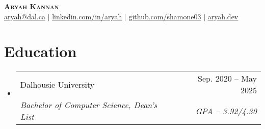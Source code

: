 \documentclass[letterpaper,11pt]{article}
\makeatletter
\newcommand{\resumeSubheading}[4]{
    \vspace{-2pt}\item
      \begin{tabular*}{0.97\textwidth}[t]{l@{\extracolsep{\fill}}r}
        #1 & #2 \\
        \textit{\small#3} & \textit{\small #4} \\
      \end{tabular*}\vspace{-7pt}
  }
\newcommand{\resumeSubHeadingListStart}{\begin{itemize}[leftmargin=0.15in, label={}]}
\newcommand{\resumeSubHeadingListEnd}{\end{itemize}}
\makeatother
\begin{document}

  \begin{center}
    \textbf{\Huge \scshape Aryah Kannan} \\ \vspace{1pt}
    \small \href{mailto:aryah@dal.ca}{\underline{aryah@dal.ca}} $|$
    \href{https://www.linkedin.com/in/aryahkannan/}{\underline{linkedin.com/in/aryah}} $|$
    \href{https://github.com/shamone03}{\underline{github.com/shamone03}} $|$
    \href{https://aryah.dev}{\underline{aryah.dev}}
  \end{center}


  \section{Education}
  \resumeSubHeadingListStart
  \resumeSubheading
  {Dalhousie University}{Sep. 2020 -- May 2025}
  {Bachelor of Computer Science, Dean's List}{GPA -- 3.92/4.30}
  \resumeSubHeadingListEnd

\end{document}
